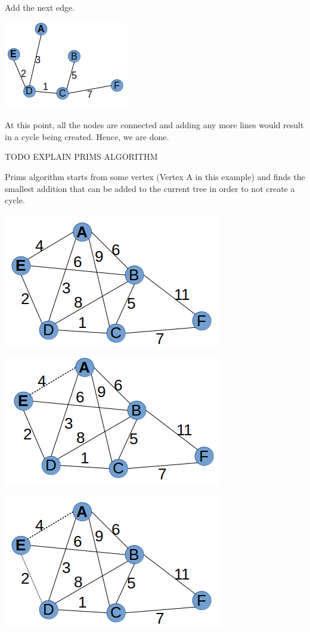 \documentclass{article}
\begin{document}
Add the next edge. 

\includegraphics[scale=0.5]{./P13/kruskals/5}

At this point, all the nodes are connected and adding any more lines would result in a cycle being created. Hence, we are done. 


TODO EXPLAIN PRIMS ALGORITHM

Prims algorithm starts from some vertex (Vertex A in this example) and finds the smallest addition that can be added to the current tree in order to not create a cycle. 

\includegraphics[scale=0.5]{./P13/prims/0}

\includegraphics[scale=0.5]{./P13/prims/1}

\includegraphics[scale=0.5]{./P13/prims/2}
\end{document}
